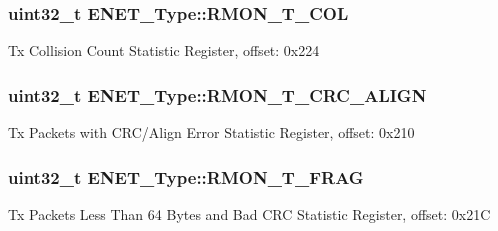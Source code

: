 \subsubsection[{\texorpdfstring{R\+M\+O\+N\+\_\+\+T\+\_\+\+C\+OL}{RMON_T_COL}}]{ uint32\+\_\+t E\+N\+E\+T\+\_\+\+Type\+::\+R\+M\+O\+N\+\_\+\+T\+\_\+\+C\+OL}\hypertarget{structENET__Type_a8fd59b7104097e11cbb184c4791ddec5}{}\label{structENET__Type_a8fd59b7104097e11cbb184c4791ddec5}
Tx Collision Count Statistic Register, offset\+: 0x224 
\subsubsection[{\texorpdfstring{R\+M\+O\+N\+\_\+\+T\+\_\+\+C\+R\+C\+\_\+\+A\+L\+I\+GN}{RMON_T_CRC_ALIGN}}]{ uint32\+\_\+t E\+N\+E\+T\+\_\+\+Type\+::\+R\+M\+O\+N\+\_\+\+T\+\_\+\+C\+R\+C\+\_\+\+A\+L\+I\+GN}\hypertarget{structENET__Type_ac3c4f7f8c87f227a3f5651618222119d}{}\label{structENET__Type_ac3c4f7f8c87f227a3f5651618222119d}
Tx Packets with C\+R\+C/\+Align Error Statistic Register, offset\+: 0x210 
\subsubsection[{\texorpdfstring{R\+M\+O\+N\+\_\+\+T\+\_\+\+F\+R\+AG}{RMON_T_FRAG}}]{ uint32\+\_\+t E\+N\+E\+T\+\_\+\+Type\+::\+R\+M\+O\+N\+\_\+\+T\+\_\+\+F\+R\+AG}\hypertarget{structENET__Type_a1c012520007c0432c76685da820eca6d}{}\label{structENET__Type_a1c012520007c0432c76685da820eca6d}
Tx Packets Less Than 64 Bytes and Bad C\+RC Statistic Register, offset\+: 0x21C 
